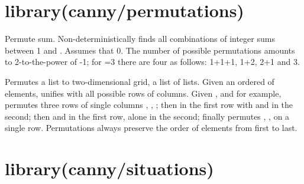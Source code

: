 \chapter{library(canny/permutations)}\label{sec:permutations}

\begin{description}
Permute sum. Non-deterministically finds all combinations of integer
sums between 1 and . Assumes that 0\Sel{}. The number of possible
permutations amounts to 2-to-the-power of -1; for =3 there are
four as follows: 1+1+1, 1+2, 2+1 and 3.

Permutes a list to two-dimensional grid, a list of lists. Given an
ordered  of elements, unifies  with all possible rows of
columns. Given ,  and  for example, permutes three rows of
single columns , , ; then  in the first row with  and
 in the second; then  and  in the first row,  alone in
the second; finally permutes , ,  on a single row.
Permutations always preserve the order of elements from first to
last.
\end{description}

\chapter{library(canny/situations)}\label{sec:situations}

